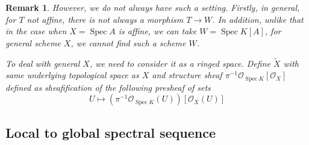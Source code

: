 \documentclass{ctexart}
\newtheorem{remark}{Remark}[section]
\newcommand{\spec}{\operatorname{Spec}}
\begin{document}
\begin{remark}
    However, we do not always have such a setting.
    Firstly, in general, for $T$ not affine, there is not always a morphism $T \rightarrow W$.
    In addition, unlike that in the case when $X = \spec A$ is affine, we can take $W = \spec K[A]$,
    for general scheme $X$, we cannot find such a scheme $W$.
    \par
    To deal with general $X$, we need to consider it as a ringed space.
    Define $\widetilde{X}$ with same underlying topological space as $X$ and structure sheaf $\pi^{-1}\mathcal{O}_{\spec K}[\mathcal{O}_{X}]$ defined as sheafification of the following presheaf of sets
    \begin{equation}
        U \longmapsto (\pi^{-1}\mathcal{O}_{\spec K}(U))[\mathcal{O}_{X}(U)]
    \end{equation}
\end{remark}

\subsection{Local to global spectral sequence}
\label{subsection:Cotangent_Complex_Local_to_global_spectral_sequence}
\end{document}
